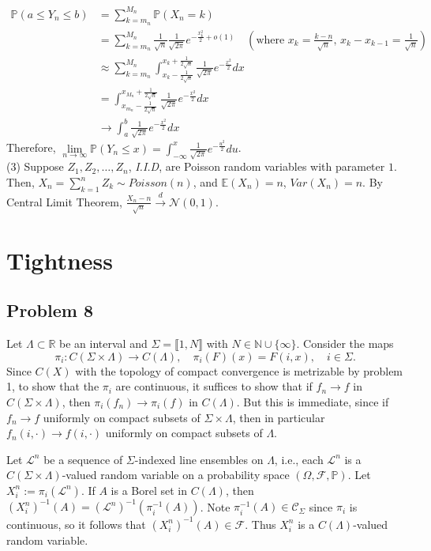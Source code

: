 \documentclass[12pt]{article}
\begin{document}
\begin{align*}
\mathbb{P}(a\leqslant Y_{n}\leqslant b)&=\sum_{k=m_{n}}^{M_{n}}\mathbb{P}(X_{n}=k)\\
&=\sum_{k=m_{n}}^{M_{n}}\frac{1}{\sqrt{n}}\frac{1}{\sqrt{2\pi}}e^{-\frac{x_{k}^2}{2}+o(1)}\quad(\text{where $x_{k}=\frac{k-n}{\sqrt{n}}$, $x_{k}-x_{k-1}=\frac{1}{\sqrt{n}}$})\\
&\approx \sum_{k=m_{n}}^{M_{n}}\int_{x_{k}-\frac{1}{2\sqrt{n}}}^{x_{k}+\frac{1}{2\sqrt{n}}} \frac{1}{\sqrt{2\pi}}e^{-\frac{x^2}{2}}dx\\
&=\int_{x_{m_{n}}-\frac{1}{2\sqrt{n}}}^{x_{M_{n}}+\frac{1}{2\sqrt{n}}} \frac{1}{\sqrt{2\pi}}e^{-\frac{x^2}{2}}dx\\
& \rightarrow \int_{a}^{b}\frac{1}{\sqrt{2\pi}}e^{-\frac{x^2}{2}}dx
\end{align*}
Therefore, $\lim\limits_{n\rightarrow\infty}\mathbb{P}(Y_{n}\leqslant x)=\int_{-\infty}^{x}\frac{1}{\sqrt{2\pi}}e^{-\frac{u^2}{2}}du$.\\
(3) Suppose $Z_{1},Z_{2},\dots, Z_{n}$, \emph{I.I.D}, are Poisson random variables with parameter $1$. Then, $X_{n}=\sum\limits_{k=1}^{n}Z_{k}\sim Poisson(n)$, and $\mathbb{E}(X_{n})=n$, $Var(X_{n})=n$. By Central Limit Theorem, $\frac{X_{n}-n}{\sqrt{n}}\xrightarrow{d}\mathcal{N}(0,1)$.


\section{Tightness}

	\subsection*{Problem 8}
	
		Let $\Lambda\subset\mathbb{R}$ be an interval and $\Sigma = \llbracket 1, N\rrbracket$ with $N\in\mathbb{N}\cup\{\infty\}$. Consider the maps 
		\[
		\pi_i : C(\Sigma\times\Lambda) \to C(\Lambda), \quad \pi_i(F)(x) = F(i,x), \quad i\in\Sigma.
		\]
		Since $C(X)$ with the topology of compact convergence is metrizable by problem 1, to show that the $\pi_i$ are continuous, it suffices to show that if $f_n\to f$ in $C(\Sigma\times\Lambda)$, then $\pi_i(f_n)\to \pi_i(f)$ in $C(\Lambda)$. But this is immediate, since if $f_n\to f$ uniformly on compact subsets of $\Sigma\times\Lambda$, then in particular $f_n(i,\cdot)\to f(i,\cdot)$ uniformly on compact subsets of $\Lambda$.
		
		Let $\mathcal{L}^n$ be a sequence of $\Sigma$-indexed line ensembles on $\Lambda$, i.e., each $\mathcal{L}^n$ is a $C(\Sigma\times\Lambda)$-valued random variable on a probability space $(\Omega,\mathcal{F},\mathbb{P})$. Let $X_i^n := \pi_i(\mathcal{L}^n)$. If $A$ is a Borel set in $C(\Lambda)$, then $(X_i^n)^{-1}(A) = (\mathcal{L}^n)^{-1}(\pi_i^{-1}(A))$. Note $\pi_i^{-1}(A)\in\mathcal{C}_\Sigma$ since $\pi_i$ is continuous, so it follows that $(X_i^n)^{-1}(A)\in\mathcal{F}$. Thus $X_i^n$ is a $C(\Lambda)$-valued random variable.
		
\end{document}
